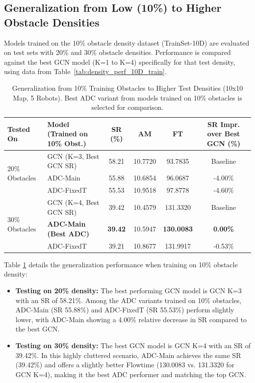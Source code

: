 \subsection{Generalization from Low (10\%) to Higher Obstacle Densities}
\label{subsec:gen_low_to_high}
Models trained on the 10\% obstacle density dataset (TrainSet-10D) are evaluated on test sets with 20\% and 30\% obstacle densities. Performance is compared against the best GCN model (K=1 to K=4) specifically for that test density, using data from Table~\ref{tab:density_perf_10D_train}.

\begin{table}[htbp]
    \centering
    \caption{Generalization from 10\% Training Obstacles to Higher Test Densities (10x10 Map, 5 Robots). Best ADC variant from models trained on 10\% obstacles is selected for comparison.}
    \label{tab:gen_10D_to_high_revised}
    \scriptsize
    \begin{tabular}{llcccc}
        \toprule
        Tested On & Model (Trained on 10\% Obst.) & SR (\%) & AM & FT & SR Impr. over Best GCN (\%) \\
        \midrule
        \multirow{3}{*}{20\% Obstacles} %
        & GCN (K=3, Best GCN SR) & 58.21 & 10.7720 & 93.7835 & Baseline \\
        & ADC-Main & 55.88 & 10.6854 & 96.0687 & -4.00\% \\
        & ADC-FixedT & 55.53 & 10.9518 & 97.8778 & -4.60\% \\
        \midrule
        \multirow{3}{*}{30\% Obstacles} %
        & GCN (K=4, Best GCN SR) & 39.42 & 10.4579 & 131.3320 & Baseline \\
        & \textbf{ADC-Main (Best ADC)} & \textbf{39.42} & 10.5947 & \textbf{130.0083} & \textbf{0.00\%} \\
        & ADC-FixedT & 39.21 & 10.8677 & 131.9917 & -0.53\% \\
        \bottomrule
    \end{tabular}
\end{table}
Table \ref{tab:gen_10D_to_high_revised} details the generalization performance when training on 10\% obstacle density:
\begin{itemize}
    \item \textbf{Testing on 20\% density:} The best performing GCN model is GCN K=3 with an SR of 58.21\%. Among the ADC variants trained on 10\% obstacles, ADC-Main (SR 55.88\%) and ADC-FixedT (SR 55.53\%) perform slightly lower, with ADC-Main showing a 4.00\% relative decrease in SR compared to the best GCN.
    \item \textbf{Testing on 30\% density:} The best GCN model is GCN K=4 with an SR of 39.42\%. In this highly cluttered scenario, ADC-Main achieves the same SR (39.42\%) and offers a slightly better Flowtime (130.0083 vs. 131.3320 for GCN K=4), making it the best ADC performer and matching the top GCN.
\end{itemize}
